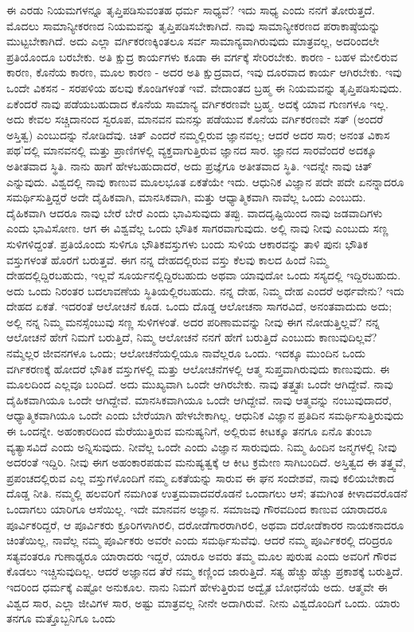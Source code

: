 ಈ ಎರಡು ನಿಯಮಗಳನ್ನೂ ತೃಪ್ತಿಪಡಿಸುವಂತಹ ಧರ್ಮ ಸಾಧ್ಯವೆ? ಇದು ಸಾಧ್ಯ ಎಂದು ನನಗೆ ತೋರುತ್ತದೆ. ಮೊದಲು ಸಾಮಾನ್ಯೀಕರಣದ ನಿಯಮವನ್ನು ತೃಪ್ತಿಪಡಿಸಬೇಕಾಗಿದೆ. ನಾವು ಸಾಮಾನ್ಯೀಕರಣದ ಪರಾಕಾಷ್ಠೆಯನ್ನು ಮುಟ್ಟಬೇಕಾಗಿದೆ. ಅದು ಎಲ್ಲಾ ವರ್ಗಿಕರಣಕ್ಕಿಂತಲೂ ಸರ್ವ ಸಾಮಾನ್ಯವಾಗಿರುವುದು ಮಾತ್ರವಲ್ಲ, ಅದರಿಂದಲೇ ಪ್ರತಿಯೊಂದೂ ಬರಬೇಕು. ಅತಿ ಕ್ಷುದ್ರ ಕಾರ್ಯಗಳು ಕೂಡಾ ಈ ವರ್ಗಕ್ಕೆ ಸೇರಿರಬೇಕು. ಕಾರಣ - ಬಹಳ ಮೇಲಿರುವ ಕಾರಣ, ಕೊನೆಯ ಕಾರಣ, ಮೂಲ ಕಾರಣ - ಅದರ ಅತಿ ಕ್ಷುದ್ರವಾದ, ಇವು ದೂರವಾದ ಕಾರ್ಯ ಆಗಿರಬೇಕು. ಇವು ಒಂದೇ ವಿಕಸನ - ಸರಪಳಿಯ ಹಲವು ಕೊಂಡಿಗಳಂತೆ ಇವೆ. ವೇದಾಂತದ ಬ್ರಹ್ಮ ಈ ನಿಯಮವನ್ನು ತೃಪ್ತಿಪಡಿಸುವುದು. ಏಕೆಂದರೆ ನಾವು ಪಡೆಯಬಹುದಾದ ಕೊನೆಯ ಸಾಮಾನ್ಯ ವರ್ಗಿಕರಣವೇ ಬ್ರಹ್ಮ. ಅದಕ್ಕೆ ಯಾವ ಗುಣಗಳೂ ಇಲ್ಲ. ಅದು ಕೇವಲ ಸಚ್ಚಿದಾನಂದ ಸ್ವರೂಪ, ಮಾನವನ ಮನಸ್ಸು ಪಡೆಯುವ ಕೊನೆಯ ವರ್ಗಿಕರಣವೇ ಸತ್ (ಅಂದರೆ ಅಸ್ತಿತ್ವ) ಎಂಬುದನ್ನು ನೋಡಿದೆವು. ಚಿತ್ ಎಂದರೆ ನಮ್ಮಲ್ಲಿರುವ ಜ್ಞಾನವಲ್ಲ; ಆದರೆ ಅದರ ಸಾರ; ಅನಂತ ವಿಕಾಸ ಪಥ'ದಲ್ಲಿ ಮಾನವನಲ್ಲಿ ಮತ್ತು ಪ್ರಾಣಿಗಳಲ್ಲಿ ವ್ಯಕ್ತವಾಗುತ್ತಿರುವ ಜ್ಞಾನದ ಸಾರ. ಜ್ಞಾನದ ಸಾರವೆಂದರೆ ಅದಕ್ಕೂ ಅತೀತವಾದ ಸ್ಥಿತಿ. ನಾನು ಹಾಗೆ ಹೇಳಬಹುದಾದರೆ, ಅದು ಪ್ರಜ್ಞೆಗೂ ಅತೀತವಾದ ಸ್ಥಿತಿ. ಇದನ್ನೇ ನಾವು ಚಿತ್ ಎನ್ನುವುದು. ವಿಶ್ವದಲ್ಲಿ ನಾವು ಕಾಣುವ ಮೂಲಭೂತ ಏಕತೆಯೇ ಇದು. ಆಧುನಿಕ ವಿಜ್ಞಾನ ಪದೇ ಪದೇ ಏನನ್ನಾದರೂ ಸಮರ್ಥಿಸುತ್ತಿದ್ದರೆ ಅದೇ ದೈಹಿಕವಾಗಿ, ಮಾನಸಿಕವಾಗಿ, ಮತ್ತು ಆಧ್ಯಾತ್ಮಿಕವಾಗಿ ನಾವೆಲ್ಲ ಒಂದು ಎಂಬುದು. ದೈಹಿಕವಾಗಿ ಆದರೂ ನಾವು ಬೇರೆ ಬೇರೆ ಎಂದು ಭಾವಿಸುವುದು ತಪ್ಪು. ವಾದದೃಷ್ಟಿಯಿಂದ ನಾವು ಜಡವಾದಿಗಳು ಎಂದು ಭಾವಿಸೋಣ. ಆಗ ಈ ವಿಶ್ವವೆಲ್ಲ ಒಂದು ಭೌತಿಕ ಸಾಗರವಾಗುವುದು. ಅಲ್ಲಿ ನಾವು ನೀವು ಎಂಬುದು ಸಣ್ಣ ಸುಳಿಗಳಿದ್ದಂತೆ. ಪ್ರತಿಯೊಂದು ಸುಳಿಗೂ ಭೌತಿಕವಸ್ತುಗಳು ಬಂದು ಸುಳಿಯ ಆಕಾರವನ್ನು ತಾಳಿ ಪುನಃ ಭೌತಿಕ ವಸ್ತುಗಳಂತೆ ಹೊರಗೆ ಬರುತ್ತವೆ. ಈಗ ನನ್ನ ದೇಹದಲ್ಲಿರುವ ವಸ್ತು ಕೆಲವು ಕಾಲದ ಹಿಂದೆ ನಿಮ್ಮ ದೇಹದಲ್ಲಿದ್ದಿರಬಹುದು, ಇಲ್ಲವೆ ಸೂರ್ಯನಲ್ಲಿದ್ದಿರಬಹುದು ಅಥವಾ ಯಾವುದೋ ಒಂದು ಸಸ್ಯದಲ್ಲಿ ಇದ್ದಿರಬಹುದು. ಅದು ಒಂದು ನಿರಂತರ ಬದಲಾವಣೆಯ ಸ್ಥಿತಿಯಲ್ಲಿರಬಹುದು. ನನ್ನ ದೇಹ, ನಿಮ್ಮ ದೇಹ ಎಂದರೆ ಅರ್ಥವೇನು? ಇದು ದೇಹದ ಏಕತೆ. ಇದರಂತೆ ಆಲೋಚನೆ ಕೂಡ. ಒಂದು ದೊಡ್ಡ ಆಲೋಚನಾ ಸಾಗರವಿದೆ, ಅನಂತವಾದುದು ಅದು; ಅಲ್ಲಿ ನನ್ನ ನಿಮ್ಮ ಮನಸ್ಸೆಂಬುವು ಸಣ್ಣ ಸುಳಿಗಳಂತೆ. ಅದರ ಪರಿಣಾಮವನ್ನು ನೀವು ಈಗ ನೋಡುತ್ತಿಲ್ಲವೆ? ನನ್ನ ಆಲೋಚನೆ ಹೇಗೆ ನಿಮಗೆ ಬರುತ್ತಿದೆ, ನಿಮ್ಮ ಆಲೋಚನೆ ನನಗೆ ಹೇಗೆ ಬರುತ್ತಿದೆ ಎಂಬುದು ಕಾಣುವುದಿಲ್ಲವೆ? ನಮ್ಮೆಲ್ಲರ ಜೀವನಗಳೂ ಒಂದು; ಆಲೋಚನೆಯಲ್ಲಿಯೂ ನಾವೆಲ್ಲರೂ ಒಂದು. ಇದಕ್ಕೂ ಮುಂದಿನ ಒಂದು ವರ್ಗಿಕರಣಕ್ಕೆ ಹೋದರೆ ಭೌತಿಕ ವಸ್ತುಗಳಲ್ಲಿ ಮತ್ತು ಆಲೋಚನೆಗಳಲ್ಲಿ ಆತ್ಮ ಸುಪ್ತವಾಗಿರುವುದು ಕಾಣುವುದು. ಈ ಮೂಲದಿಂದ ಎಲ್ಲವೂ ಬಂದಿದೆ. ಅದು ಮುಖ್ಯವಾಗಿ ಒಂದೇ ಆಗಿರಬೇಕು. ನಾವು ತತ್ತ್ವತಃ ಒಂದೇ ಆಗಿದ್ದೇವೆ. ನಾವು ದೈಹಿಕವಾಗಿಯೂ ಒಂದೇ ಆಗಿದ್ದೇವೆ. ಮಾನಸಿಕವಾಗಿಯೂ ಒಂದೇ ಆಗಿದ್ದೇವೆ. ನಾವು ಆತ್ಮವನ್ನು ನಂಬುವುದಾದರೆ, ಆಧ್ಯಾತ್ಮಿಕವಾಗಿಯೂ ಒಂದೇ ಎಂದು ಬೇರೆಯಾಗಿ ಹೇಳಬೇಕಾಗಿಲ್ಲ. ಆಧುನಿಕ ವಿಜ್ಞಾನ ಪ್ರತಿದಿನ ಸಮರ್ಥಿಸುತ್ತಿರುವುದು ಈ ಒಂದನ್ನೇ. ಅಹಂಕಾರದಿಂದ ಮೆರೆಯುತ್ತಿರುವ ಮನುಷ್ಯನಿಗೆ, ಅಲ್ಲಿರುವ ಕೀಟಕ್ಕೂ ತನಗೂ ಏನೊ ತುಂಬಾ ವ್ಯತ್ಯಾಸವಿದೆ ಎಂದು ಅನ್ನಿಸುವುದು. ನೀವೆಲ್ಲ ಒಂದೇ ಎಂದು ವಿಜ್ಞಾನ ಸಾರುವುದು. ನಿಮ್ಮ ಹಿಂದಿನ ಜನ್ಮಗಳಲ್ಲಿ ನೀವು ಅದರಂತೆ ಇದ್ದಿರಿ. ನೀವು ಈಗ ಅಹಂಕಾರಪಡುವ ಮನುಷ್ಯತ್ವಕ್ಕೆ ಆ ಕೀಟ ಕ್ರಮೇಣ ಸಾಗಿಬಂದಿದೆ. ಅಸ್ತಿತ್ವದ ಈ ತತ್ತ್ವವೆ, ಪ್ರಪಂಚದಲ್ಲಿರುವ ಎಲ್ಲ ವಸ್ತುಗಳೊಂದಿಗೆ ನಮ್ಮ ಏಕತೆಯನ್ನು ಸಾರುವ ಈ ಘನ ಸಂದೇಶವೆ, ನಾವು ಕಲಿಯಬೇಕಾದ ದೊಡ್ಡ ನೀತಿ. ನಮ್ಮಲ್ಲಿ ಹಲವರಿಗೆ ನಮಗಿಂತ ಉತ್ತಮವಾದವರೊಡನೆ ಒಂದಾಗಲು ಆಸೆ; ತಮಗಿಂತ ಕೀಳಾದವರೊಡನೆ ಒಂದಾಗಲು ಯಾರಿಗೂ ಆಸೆಯಿಲ್ಲ. ಇದೇ ಮಾನವನ ಅಜ್ಞಾನ. ಸಮಾಜವು ಗೌರವದಿಂದ ಕಾಣುವ ಯಾರಾದರೂ ಪೂರ್ವಿಕರಿದ್ದರೆ, ಆ ಪೂರ್ವಿಕರು ಕ್ರೂರಿಗಳಾಗಿರಲಿ, ದರೋಡೆಗಾರರಾಗಿರಲಿ, ಅಥವಾ ದರೋಡೆಕಾರರ ನಾಯಕನಾದರೂ ಚಿಂತೆಯಿಲ್ಲ, ನಾವೆಲ್ಲ ನಮ್ಮ ಪೂರ್ವಿಕರು ಅವರೇ ಎಂದು ಸಮರ್ಥಿಸುವೆವು. ಆದರೆ ನಮ್ಮ ಪೂರ್ವಿಕರಲ್ಲಿ ದರಿದ್ರರೂ ಸತ್ಯವಂತರೂ ಗುಣಾಢ್ಯರೂ ಯಾರಾದರು ಇದ್ದರೆ, ಯಾರೂ ಅವರು ತಮ್ಮ ಮೂಲ ಪುರುಷ ಎಂದು ಅವರಿಗೆ ಗೌರವ ಕೊಡಲು ಇಚ್ಚಿಸುವುದಿಲ್ಲ. ಆದರೆ ಅಜ್ಞಾನದ ತೆರೆ ನಮ್ಮ ಕಣ್ಣಿಂದ ಜಾರುತ್ತಿದೆ. ಸತ್ಯ ಹೆಚ್ಚು ಹೆಚ್ಚು ಪ್ರಕಾಶಕ್ಕೆ ಬರುತ್ತಿದೆ. ಇದರಿಂದ ಧರ್ಮಕ್ಕೆ ಎಷ್ಟೋ ಅನುಕೂಲ. ನಾನು ನಿಮಗೆ ಹೇಳುತ್ತಿರುವ ಅದ್ವೈತ ಬೋಧನೆಯೆ ಅದು. ಆತ್ಮವೇ ಈ ವಿಶ್ವದ ಸಾರ, ಎಲ್ಲಾ ಜೀವಿಗಳ ಸಾರ, ಅಷ್ಟು ಮಾತ್ರವಲ್ಲ ನೀನೇ ಅದಾಗಿರುವೆ. ನೀನು ವಿಶ್ವದೊಂದಿಗೆ ಒಂದು. ಯಾರು ತನಗೂ ಮತ್ತೊಬ್ಬನಿಗೂ ಒಂದು 